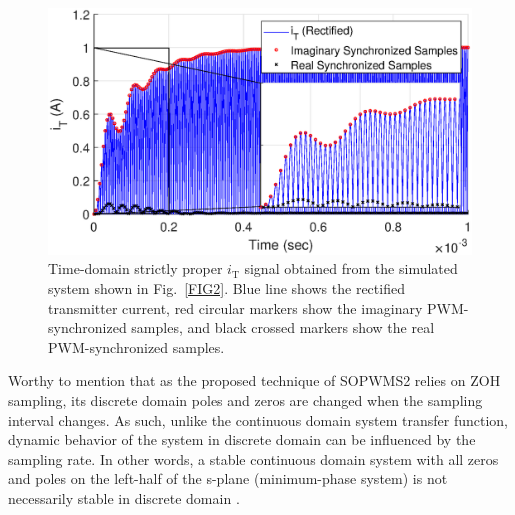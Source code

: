 \documentclass[journal,a4paper,10pt,twoside]{IEEEtran} %
\begin{document}
	 \begin{figure}
	 \vspace{0.4cm}
	     \centering
	     \includegraphics[clip, trim=0.7cm 0cm 1cm 0cm, width=1\columnwidth]{FIGS/FIG17.eps}
	     \caption{Time-domain strictly proper $i_\mathrm{T}$ signal obtained from the simulated system shown in Fig.~\ref{FIG2}. Blue line shows the rectified transmitter current, red circular markers show the imaginary PWM-synchronized samples, and black crossed markers show the real PWM-synchronized samples.}
	     \label{FIG17}
	     \vspace{-3mm}
	 \end{figure}
	 
	 Worthy to mention that as the proposed technique of SOPWMS2 relies on ZOH sampling, its discrete domain poles and zeros are changed when the sampling interval changes. As such, unlike the continuous domain system transfer function, dynamic behavior of the system in discrete domain can be influenced by the sampling rate. %
	 In other words, a stable continuous domain system with all zeros and poles on the left-half of the s-plane (minimum-phase system) is not necessarily stable in discrete domain \cite{UNSTABLE_1,UNSTABLE_2}.
	 
\end{document}
